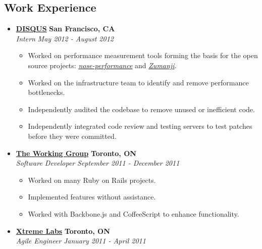 \documentclass[10pt,letterpaper]{article}
\begin{document}
\subsection*{Work Experience}
  \begin{itemize}
    \parskip=-0.1em

    \item[]
    {\href{http://www.disqus.com}{\textbf{DISQUS}} \hfill
      \textbf{San Francisco, CA}}
    \\
    {\emph{Intern} \hfill \emph{May 2012 - August 2012}}

    \begin{itemize}[label=\textbullet]
      \itemsep0em
      \item Worked on performance measurement tools forming the basis for the
            open source projects:
            \href{https://github.com/disqus/nose-performance}{\textit{nose-performance}}
            and \href{https://github.com/disqus/zumanji}{\textit{Zumanji}}.
      \item Worked on the infrastructure team to identify and remove performance
            bottlenecks.
      \item Independently audited the codebase to remove unused or inefficient
            code.
      \item Independently integrated code review and testing servers to test
            patches before they were committed.
    \end{itemize}


    \item[]
    {\href{http://www.twg.ca}{\textbf{The Working Group}} \hfill
      \textbf{Toronto, ON}}
    \\
    {\emph{Software Developer} \hfill \emph{September 2011 - December 2011}}

    \begin{itemize}[label=\textbullet]
      \itemsep0em
      \item Worked on many Ruby on Rails projects.
      \item Implemented features without assistance.
      \item Worked with Backbone.js and CoffeeScript to enhance functionality.
    \end{itemize}

    \item[]

    {\href{http://www.xtremelabs.com/}{\textbf{Xtreme Labs}} \hfill
      \textbf{Toronto, ON}}
    \\
    {\emph{Agile Engineer} \hfill \emph{January 2011 - April 2011}}


\end{itemize}
\end{document}
